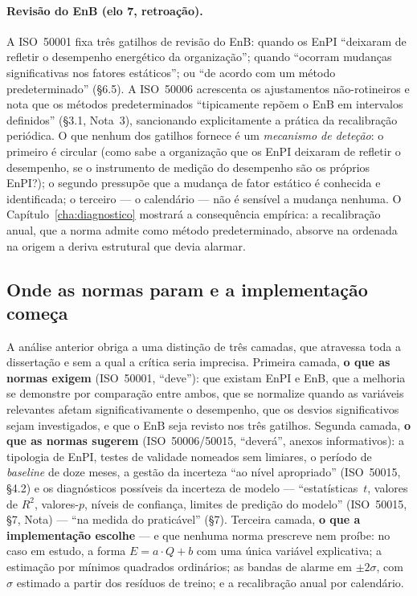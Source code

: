 \paragraph{Revisão do EnB (elo 7, retroação).} A ISO~50001 fixa três gatilhos de revisão do EnB: quando os EnPI \enquote{deixaram de refletir o desempenho energético da organização}; quando \enquote{ocorram mudanças significativas nos fatores estáticos}; ou \enquote{de acordo com um método predeterminado} (\S6.5). A ISO~50006 acrescenta os ajustamentos não-rotineiros e nota que os métodos predeterminados \enquote{tipicamente repõem o EnB em intervalos definidos} (\S3.1, Nota~3), sancionando explicitamente a prática da recalibração periódica. O que nenhum dos gatilhos fornece é um \emph{mecanismo de deteção}: o primeiro é circular (como sabe a organização que os EnPI deixaram de refletir o desempenho, se o instrumento de medição do desempenho são os próprios EnPI?); o segundo pressupõe que a mudança de fator estático é conhecida e identificada; o terceiro --- o calendário --- não é sensível a mudança nenhuma. O Capítulo~\ref{cha:diagnostico} mostrará a consequência empírica: a recalibração anual, que a norma admite como método predeterminado, absorve na ordenada na origem a deriva estrutural que devia alarmar.

\subsection{Onde as normas param e a implementação começa}
\label{sec:enb-camadas}

A análise anterior obriga a uma distinção de três camadas, que atravessa toda a dissertação e sem a qual a crítica seria imprecisa. Primeira camada, \textbf{o que as normas exigem} (ISO~50001, \enquote{deve}): que existam EnPI e EnB, que a melhoria se demonstre por comparação entre ambos, que se normalize quando as variáveis relevantes afetam significativamente o desempenho, que os desvios significativos sejam investigados, e que o EnB seja revisto nos três gatilhos. Segunda camada, \textbf{o que as normas sugerem} (ISO~50006/50015, \enquote{deverá}, anexos informativos): a tipologia de EnPI, testes de validade nomeados sem limiares, o período de \emph{baseline} de doze meses, a gestão da incerteza \enquote{ao nível apropriado} (ISO~50015, \S4.2) e os diagnósticos possíveis da incerteza de modelo --- \enquote{estatísticas~$t$, valores de $R^2$, valores-$p$, níveis de confiança, limites de predição do modelo} (ISO~50015, \S7, Nota) --- \enquote{na medida do praticável} (\S7). Terceira camada, \textbf{o que a implementação escolhe} --- e que nenhuma norma prescreve nem proíbe: no caso em estudo, a forma $E = a \cdot Q + b$ com uma única variável explicativa; a estimação por mínimos quadrados ordinários; as bandas de alarme em $\pm 2\sigma$, com $\sigma$ estimado a partir dos resíduos de treino; e a recalibração anual por calendário.

